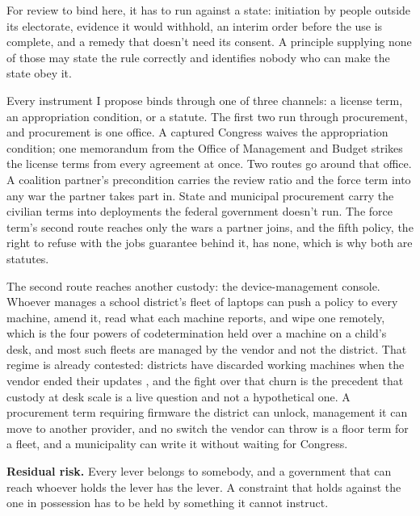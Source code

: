 For review to bind here, it has to run against a state: initiation by people outside its electorate, evidence it would withhold, an interim order before the use is complete, and a remedy that doesn't need its consent. A principle supplying none of those may state the rule correctly and identifies nobody who can make the state obey it.

Every instrument I propose binds through one of three channels: a license term, an appropriation condition, or a statute. The first two run through procurement, and procurement is one office. A captured Congress waives the appropriation condition; one memorandum from the Office of Management and Budget strikes the license terms from every agreement at once. Two routes go around that office. A coalition partner's precondition carries the review ratio and the force term into any war the partner takes part in. State and municipal procurement carry the civilian terms into deployments the federal government doesn't run. The force term's second route reaches only the wars a partner joins, and the fifth policy, the right to refuse with the jobs guarantee behind it, has none, which is why both are statutes.

The second route reaches another custody: the device-management console. Whoever manages a school district's fleet of laptops can push a policy to every machine, amend it, read what each machine reports, and wipe one remotely, which is the four powers of codetermination held over a machine on a child's desk, and most such fleets are managed by the vendor and not the district. That regime is already contested: districts have discarded working machines when the vendor ended their updates \autocite{pirg2023chromebook}, and the fight over that churn is the precedent that custody at desk scale is a live question and not a hypothetical one. A procurement term requiring firmware the district can unlock, management it can move to another provider, and no switch the vendor can throw is a floor term for a fleet, and a municipality can write it without waiting for Congress.

\textbf{Residual risk.} Every lever belongs to somebody, and a government that can reach whoever holds the lever has the lever. A constraint that holds against the one in possession has to be held by something it cannot instruct.
